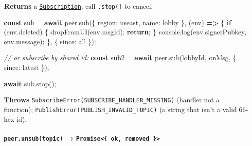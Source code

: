 \documentclass[
  nobib]{tufte-handout}
\newenvironment{Shaded}{}{}
\newcommand{\AttributeTok}[1]{\textcolor[rgb]{0.49,0.56,0.16}{#1}}
\newcommand{\BuiltInTok}[1]{\textcolor[rgb]{0.00,0.50,0.00}{#1}}
\newcommand{\CommentTok}[1]{\textcolor[rgb]{0.38,0.63,0.69}{\textit{#1}}}
\newcommand{\ControlFlowTok}[1]{\textcolor[rgb]{0.00,0.44,0.13}{\textbf{#1}}}
\newcommand{\DataTypeTok}[1]{\textcolor[rgb]{0.56,0.13,0.00}{#1}}
\newcommand{\FunctionTok}[1]{\textcolor[rgb]{0.02,0.16,0.49}{#1}}
\newcommand{\KeywordTok}[1]{\textcolor[rgb]{0.00,0.44,0.13}{\textbf{#1}}}
\newcommand{\NormalTok}[1]{#1}
\newcommand{\OperatorTok}[1]{\textcolor[rgb]{0.40,0.40,0.40}{#1}}
\newcommand{\StringTok}[1]{\textcolor[rgb]{0.25,0.44,0.63}{#1}}
\begin{document}
\textbf{Returns} a \hyperref[subscription-type]{\texttt{Subscription}};
call \texttt{.stop()} to cancel.

\begin{Shaded}
\begin{Highlighting}[]
\KeywordTok{const}\NormalTok{ sub }\OperatorTok{=} \ControlFlowTok{await}\NormalTok{ peer}\OperatorTok{.}\FunctionTok{sub}\NormalTok{(\{ }\DataTypeTok{region}\OperatorTok{:} \StringTok{\textquotesingle{}useast\textquotesingle{}}\OperatorTok{,} \DataTypeTok{name}\OperatorTok{:} \StringTok{\textquotesingle{}lobby\textquotesingle{}}\NormalTok{ \}}\OperatorTok{,}\NormalTok{ (env) }\KeywordTok{=\textgreater{}}\NormalTok{ \{}
  \ControlFlowTok{if}\NormalTok{ (env}\OperatorTok{.}\AttributeTok{deleted}\NormalTok{) \{ }\FunctionTok{dropFromUI}\NormalTok{(env}\OperatorTok{.}\AttributeTok{msgId}\NormalTok{)}\OperatorTok{;} \ControlFlowTok{return}\OperatorTok{;}\NormalTok{ \}}
  \BuiltInTok{console}\OperatorTok{.}\FunctionTok{log}\NormalTok{(env}\OperatorTok{.}\AttributeTok{signerPubkey}\OperatorTok{,}\NormalTok{ env}\OperatorTok{.}\AttributeTok{message}\NormalTok{)}\OperatorTok{;}
\NormalTok{\}}\OperatorTok{,}\NormalTok{ \{ }\DataTypeTok{since}\OperatorTok{:} \StringTok{\textquotesingle{}all\textquotesingle{}}\NormalTok{ \})}\OperatorTok{;}

\CommentTok{// or subscribe by shared id:}
\KeywordTok{const}\NormalTok{ sub2 }\OperatorTok{=} \ControlFlowTok{await}\NormalTok{ peer}\OperatorTok{.}\FunctionTok{sub}\NormalTok{(lobbyId}\OperatorTok{,}\NormalTok{ onMsg}\OperatorTok{,}\NormalTok{ \{ }\DataTypeTok{since}\OperatorTok{:} \StringTok{\textquotesingle{}latest\textquotesingle{}}\NormalTok{ \})}\OperatorTok{;}

\ControlFlowTok{await}\NormalTok{ sub}\OperatorTok{.}\FunctionTok{stop}\NormalTok{()}\OperatorTok{;}
\end{Highlighting}
\end{Shaded}

\textbf{Throws} \texttt{SubscribeError(SUBSCRIBE\_HANDLER\_MISSING)}
(handler not a function); \texttt{PublishError(PUBLISH\_INVALID\_TOPIC)}
(a string that isn't a valid 66-hex id).

\paragraph{\texorpdfstring{\texttt{peer.unsub(topic)} →
\texttt{Promise\textless{}\{\ ok,\ removed\ \}\textgreater{}}}{peer.unsub(topic) → Promise\textless\{ ok, removed \}\textgreater{}}}\label{peer.unsubtopic-promise-ok-removed}
\end{document}

